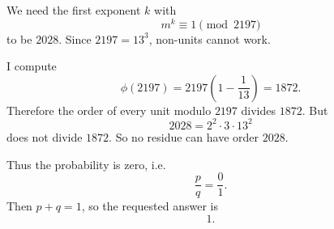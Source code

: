 We need the first exponent \(k\) with
\[
m^k\equiv1\pmod {2197}
\]
to be \(2028\).  Since \(2197=13^3\), non-units cannot work.

I compute
\[
\phi(2197)=2197\left(1-\frac1{13}\right)=1872.
\]
Therefore the order of every unit modulo \(2197\) divides \(1872\).  But
\[
2028=2^2\cdot 3\cdot 13^2
\]
does not divide \(1872\).  So no residue can have order \(2028\).

Thus the probability is zero, i.e.
\[
\frac{p}{q}=\frac01.
\]
Then \(p+q=1\), so the requested answer is
\[
\boxed{1}.
\]
